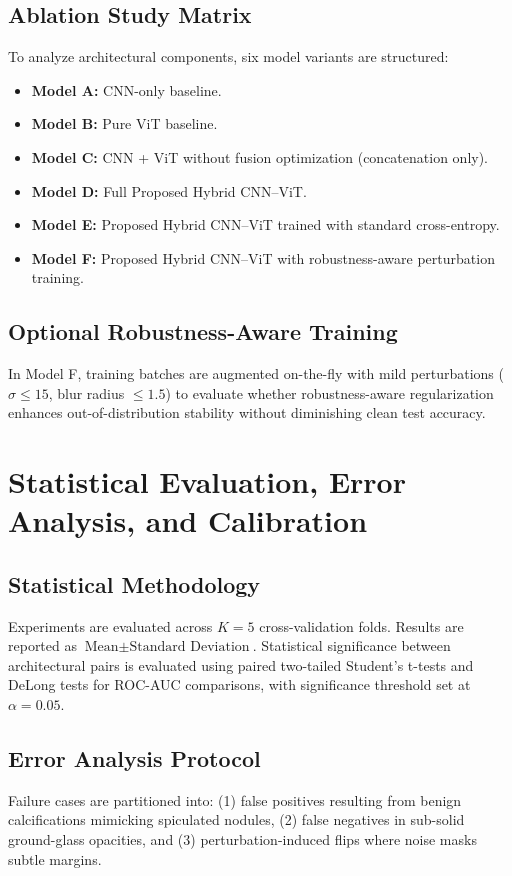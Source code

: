 \documentclass[conference]{IEEEtran}
\begin{document}
\subsection{Ablation Study Matrix}
To analyze architectural components, six model variants are structured:
\begin{itemize}
    \item \textbf{Model A:} CNN-only baseline.
    \item \textbf{Model B:} Pure ViT baseline.
    \item \textbf{Model C:} CNN + ViT without fusion optimization (concatenation only).
    \item \textbf{Model D:} Full Proposed Hybrid CNN--ViT.
    \item \textbf{Model E:} Proposed Hybrid CNN--ViT trained with standard cross-entropy.
    \item \textbf{Model F:} Proposed Hybrid CNN--ViT with robustness-aware perturbation training.
\end{itemize}

\subsection{Optional Robustness-Aware Training}
In Model F, training batches are augmented on-the-fly with mild perturbations ($\sigma \le 15$, blur radius $\le 1.5$) to evaluate whether robustness-aware regularization enhances out-of-distribution stability without diminishing clean test accuracy.

\section{Statistical Evaluation, Error Analysis, and Calibration}
\label{sec:statistical}

\subsection{Statistical Methodology}
Experiments are evaluated across $K = 5$ cross-validation folds. Results are reported as $\text{Mean} \pm \text{Standard Deviation}$. Statistical significance between architectural pairs is evaluated using paired two-tailed Student's t-tests and DeLong tests for ROC-AUC comparisons, with significance threshold set at $\alpha = 0.05$.

\subsection{Error Analysis Protocol}
Failure cases are partitioned into: (1) false positives resulting from benign calcifications mimicking spiculated nodules, (2) false negatives in sub-solid ground-glass opacities, and (3) perturbation-induced flips where noise masks subtle margins.
\end{document}
